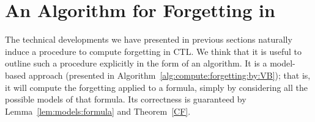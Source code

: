 \documentclass{article}
\newtheorem{example}{Example}
\begin{document}
%
%


\section{An Algorithm for Forgetting in \CTL\ }
\label{section_algorithm}
The technical developments we have presented in previous sections naturally induce a procedure to compute forgetting in CTL. We think that it is useful to outline such a procedure explicitly in the form of an algorithm.  It is a model-based approach (presented in Algorithm~\ref{alg:compute:forgetting:by:VB}); that is,  it will compute the forgetting applied to a formula, simply  by considering all the possible models of that formula.  Its correctness is guaranteed by Lemma~\ref{lem:models:formula} and Theorem~\ref{CF}.
\end{document}
